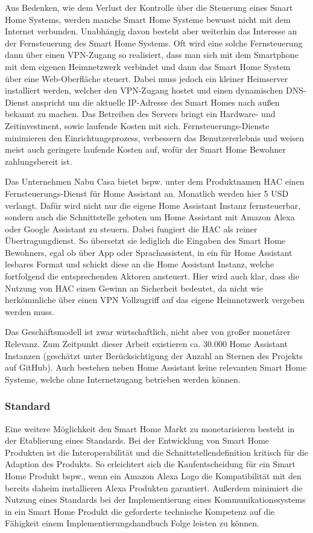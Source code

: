 Aus Bedenken, wie dem Verlust der Kontrolle über die Steuerung eines Smart Home Systems, werden manche Smart Home Systeme bewusst nicht mit dem Internet verbunden.
Unabhängig davon besteht aber weiterhin das Interesse an der Fernsteuerung des Smart Home Systems.
Oft wird eine solche Fernsteuerung dann über einen \ac{VPN}-Zugang so realisiert, dass man sich mit dem Smartphone mit dem eigenen Heimnetzwerk verbindet und dann das Smart Home System über eine Web-Oberfläche steuert.
Dabei muss jedoch ein kleiner Heimserver installiert werden, welcher den \ac{VPN}-Zugang hostet und einen dynamischen \ac{DNS}-Dienst anspricht um die aktuelle IP-Adresse des Smart Homes nach außen bekannt zu machen.
Das Betreiben des Servers bringt ein Hardware- und Zeitinvestment, sowie laufende Kosten mit sich.
Fernsteuerungs-Dienste minimieren den Einrichtungsprozess, verbessern das Benutzererlebnis und weisen meist auch geringere laufende Kosten auf, wofür der Smart Home Bewohner zahlungsbereit ist.

Das Unternehmen Nabu Casa bietet bspw. unter dem Produktnamen \ac{HAC} einen Fernsteuerungs-Dienst für Home Assistant an.
Monatlich werden hier 5 USD verlangt.
Dafür wird nicht nur die eigene Home Assistant Instanz fernsteuerbar, sondern auch die Schnittstelle geboten um Home Assistant mit Amazon Alexa oder Google Assistant zu steuern.
Dabei fungiert die \ac{HAC} als reiner Übertragungdienst.
So übersetzt sie lediglich die Eingaben des Smart Home Bewohners, egal ob über App oder Sprachassistent, in ein für Home Assistant lesbares Format und schickt diese an die Home Assistant Instanz, welche fortfolgend die entsprechenden Aktoren ansteuert.
Hier wird auch klar, dass die Nutzung von \ac{HAC} einen Gewinn an Sicherheit bedeutet, da nicht wie herkömmliche über einen \ac{VPN} Vollzugriff auf das eigene Heimnetzwerk vergeben werden muss.

Das Geschäftsmodell ist zwar wirtschaftlich, nicht aber von großer monetärer Relevanz.
Zum Zeitpunkt dieser Arbeit existieren ca. 30.000 Home Assistant Instanzen (geschätzt unter Berücksichtigung der Anzahl an Sternen des Projekts auf GitHub).
Auch bestehen neben Home Assistant keine relevanten Smart Home Systeme, welche ohne Internetzugang betrieben werden können.

\subsubsection{Standard}

Eine weitere Möglichkeit den Smart Home Markt zu monetarisieren besteht in der Etablierung eines Standards.
Bei der Entwicklung von Smart Home Produkten ist die Interoperabilität und die Schnittstellendefinition kritisch für die Adaption des Produkts.
So erleichtert sich die Kaufentscheidung für ein Smart Home Produkt bspw., wenn ein Amazon Alexa Logo die Kompatibilität mit den bereits daheim installieren Alexa Produkten garantiert.
Außerdem minimiert die Nutzung eines Standards bei der Implementierung eines Kommunikationssystems in ein Smart Home Produkt die geforderte technische Kompetenz auf die Fähigkeit einem Implementierungshandbuch Folge leisten zu können.

